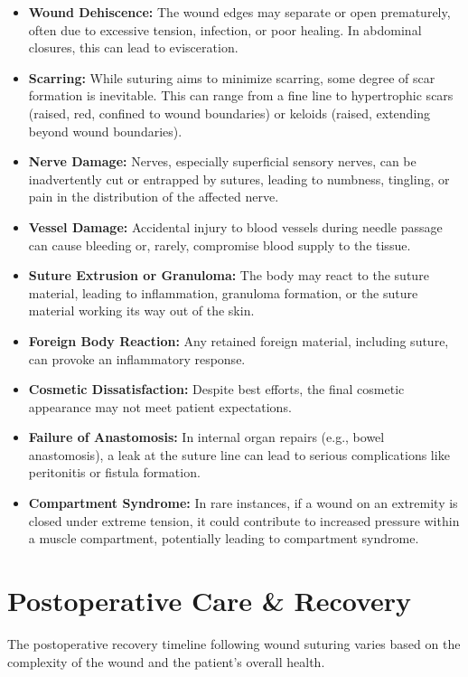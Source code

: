 \begin{itemize}
  \item \textbf{Wound Dehiscence:} The wound edges may separate or open prematurely, often due to excessive tension, infection, or poor healing. In abdominal closures, this can lead to evisceration.
  
  \item \textbf{Scarring:} While suturing aims to minimize scarring, some degree of scar formation is inevitable. This can range from a fine line to hypertrophic scars (raised, red, confined to wound boundaries) or keloids (raised, extending beyond wound boundaries).
  
  \item \textbf{Nerve Damage:} Nerves, especially superficial sensory nerves, can be inadvertently cut or entrapped by sutures, leading to numbness, tingling, or pain in the distribution of the affected nerve.
  
  \item \textbf{Vessel Damage:} Accidental injury to blood vessels during needle passage can cause bleeding or, rarely, compromise blood supply to the tissue.
  
  \item \textbf{Suture Extrusion or Granuloma:} The body may react to the suture material, leading to inflammation, granuloma formation, or the suture material working its way out of the skin.
  
  \item \textbf{Foreign Body Reaction:} Any retained foreign material, including suture, can provoke an inflammatory response.
  
  \item \textbf{Cosmetic Dissatisfaction:} Despite best efforts, the final cosmetic appearance may not meet patient expectations.
  
  \item \textbf{Failure of Anastomosis:} In internal organ repairs (e.g., bowel anastomosis), a leak at the suture line can lead to serious complications like peritonitis or fistula formation.
  
  \item \textbf{Compartment Syndrome:} In rare instances, if a wound on an extremity is closed under extreme tension, it could contribute to increased pressure within a muscle compartment, potentially leading to compartment syndrome.
\end{itemize}

\section*{Postoperative Care \& Recovery}
The postoperative recovery timeline following wound suturing varies based on the complexity of the wound and the patient's overall health. 

